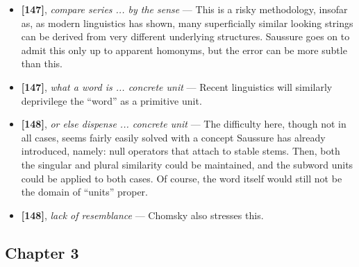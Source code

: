 \documentclass[12pt]{article}
\begin{document}
\begin{itemize}
\item \textbf{[147]}, \textit{compare series ... by the sense} --- This is a risky methodology, insofar as, as modern linguistics has shown, many superficially similar looking strings can be derived from very different underlying structures. Saussure goes on to admit this only up to apparent homonyms, but the error can be more subtle than this.

\item \textbf{[147]}, \textit{what a word is ... concrete unit} --- Recent linguistics will similarly deprivilege the ``word'' as a primitive unit.

\item \textbf{[148]}, \textit{or else dispense ... concrete unit} --- The difficulty here, though not in all cases, seems fairly easily solved with a concept Saussure has already introduced, namely: null operators that attach to stable stems. Then, both the singular and plural similarity could be maintained, and the subword units could be applied to both cases. Of course, the word itself would still not be the domain of ``units'' proper.

\item \textbf{[148]}, \textit{lack of resemblance} --- Chomsky also stresses this.

\end{itemize}

\subsection{Chapter 3}
\end{document}
